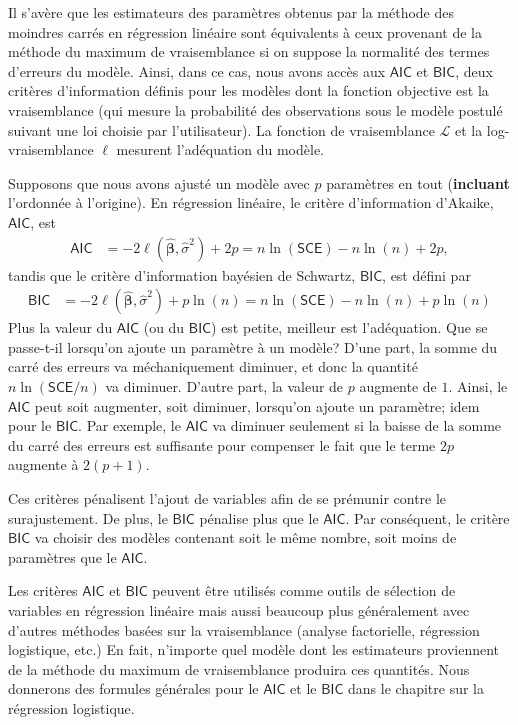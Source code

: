 \documentclass[
  11pt,
  letterpaper,
]{book}
\theoremstyle{definition}
\theoremstyle{definition}
\theoremstyle{definition}
\theoremstyle{remark}
\begin{document}
Il s'avère que les estimateurs des paramètres obtenus par la méthode des moindres carrés en régression linéaire sont équivalents à ceux provenant de la méthode du maximum de vraisemblance si on suppose la normalité des termes d'erreurs du modèle. Ainsi, dans ce cas, nous avons accès aux \(\mathsf{AIC}\) et \(\mathsf{BIC}\), deux critères d'information définis pour les modèles dont la fonction objective est la vraisemblance (qui mesure la probabilité des observations sous le modèle postulé suivant une loi choisie par l'utilisateur). La fonction de vraisemblance \(\mathcal{L}\) et la log-vraisemblance \(\ell\) mesurent l'adéquation du modèle.

Supposons que nous avons ajusté un modèle avec \(p\) paramètres en tout (\textbf{incluant} l'ordonnée à l'origine). En régression linéaire, le critère d'information d'Akaike, \(\mathsf{AIC}\), est
\begin{align*}
\mathsf{AIC} &=-2 \ell(\widehat{\boldsymbol{\beta}}, \widehat{\sigma}^2) +2p=n \ln (\mathsf{SCE}) - n\ln(n) + 2p,
\end{align*}
tandis que le critère d'information bayésien de Schwartz, \(\mathsf{BIC}\), est défini par
\begin{align*}
\mathsf{BIC} &=-2 \ell(\widehat{\boldsymbol{\beta}}, \widehat{\sigma}^2) + p\ln(n)=n \ln (\mathsf{SCE}) - n\ln(n) + p\ln(n)
\end{align*}
Plus la valeur du \(\mathsf{AIC}\) (ou du \(\mathsf{BIC}\)) est petite, meilleur est l'adéquation. Que se passe-t-il lorsqu'on ajoute un paramètre à un modèle? D'une part, la somme du carré des erreurs va méchaniquement diminuer, et donc la quantité \(n \ln (\mathsf{SCE}/n)\) va diminuer. D'autre part, la valeur de \(p\) augmente de \(1\). Ainsi, le \(\mathsf{AIC}\) peut soit augmenter, soit diminuer, lorsqu'on ajoute un paramètre; idem pour le \(\mathsf{BIC}\). Par exemple, le \(\mathsf{AIC}\) va diminuer seulement si la baisse de la somme du carré des erreurs est suffisante pour compenser le fait que le terme \(2p\) augmente à \(2 (p+1)\).

Ces critères pénalisent l'ajout de variables afin de se prémunir contre le surajustement. De plus, le \(\mathsf{BIC}\) pénalise plus que le \(\mathsf{AIC}\). Par conséquent, le critère \(\mathsf{BIC}\) va choisir des modèles contenant soit le même nombre, soit moins de paramètres que le \(\mathsf{AIC}\).

Les critères \(\mathsf{AIC}\) et \(\mathsf{BIC}\) peuvent être utilisés comme outils de sélection de variables en régression linéaire mais aussi beaucoup plus généralement avec d'autres méthodes basées sur la vraisemblance (analyse factorielle, régression logistique, etc.) En fait, n'importe quel modèle dont les estimateurs proviennent de la méthode du maximum de vraisemblance produira ces quantités. Nous donnerons des formules générales pour le \(\mathsf{AIC}\) et le \(\mathsf{BIC}\) dans le chapitre sur la régression logistique.
\end{document}
